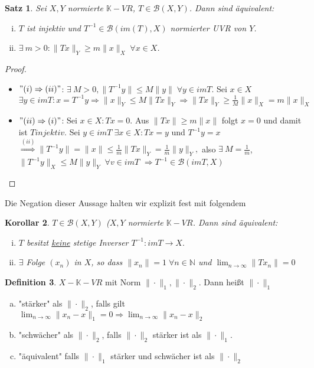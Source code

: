 \documentclass[ngerman]{report}
\theoremstyle{plain}%
\newtheorem{thm}{Satz}[chapter]
\newtheorem{cor}[thm]{Korollar}
\theoremstyle{definition}%
\newtheorem{definition}[thm]{Definition}
\theoremstyle{myStyle}
\newcommand{\N}{\mathbb{N}}
\newcommand{\K}{\mathbb{K}}
\newcommand{\B}{\mathcal{B}} %
\newcommand{\BS}[1][X,Y]{\mathcal{B}(#1)} %
\newcommand{\norm}[1]{\|#1\|}
\newcommand{\df}[1][]{%
	\overset{#1}{\Rightarrow}
}
\newcommand{\limes}[1][\infty]{\lim_{n \to #1}}
\newcommand{\inv}[1]{#1^{-1}}
\newcommand{\disp}{\displaystyle}
\newcommand{\qmarks}[1]{"#1"}
\begin{document}
	\begin{thm}
		Sei $X,Y$ normierte $\K-VR$, $T\in \BS$. Dann sind äquivalent:
			\begin{enumerate}[(i)]
				\item $T$ ist injektiv und $\inv{T} \in\B(im(T), X)$ normierter UVR von $Y$.
				\item $\exists \: m > 0: \norm{Tx}_Y \geq m\norm{x}_X \; \forall x\in X$.
			\end{enumerate}
	\end{thm}
	\begin{proof}
		\begin{itemize}[]
			\item $"(i)\df (ii)"$: $\exists \: M>0, \norm{\inv{T}y} \leq M\norm{y} \; \forall y\in imT.$
				Sei $x\in X$ $\exists y\in imT: x = \inv{T}y \df \norm{x}_Y \leq M \norm{Tx}_Y 
				\df \norm{Tx}_Y \geq \frac{1}{M} \norm{x}_X = m\norm{x}_X$
			\item $"(ii) \df (i)"$: Sei $x\in X: Tx = 0$.
				Aus $\norm{Tx} \geq m \norm{x}$ folgt $x = 0$ und damit ist $T injektiv$.
				Sei $y\in imT \; \exists x\in X: Tx = y$ und $\inv{T}y = x $
				$\df[(ii)] \norm{\inv{T}y} = \norm{x} \leq \frac{1}{m} \norm{Tx}_Y = \frac{1}{m} \norm{y}_Y,$
				also $\exists\: M = \frac{1}{m}$, $\norm{\inv{T}y}_X \leq M\norm{y}_Y \; \forall v\in imT$
				$\df \inv{T} \in \B(imT,X)$
		\end{itemize}
	\end{proof}
Die Negation dieser Aussage halten wir explizit fest mit folgendem 
	\begin{cor}
		$T \in \BS$ ($X,Y$ normierte $\K-VR$. Dann sind äquivalent:
			\begin{enumerate}[(i)]
				\item $T$ besitzt \underline{keine} stetige Inverser 
					$\inv{T} : imT\to X.$
				\item $\exists$ Folge $(x_n)$ in $X$, so dass $\norm{x_n} = 1 \; \forall n\in \N$
					und $\disp \limes \norm{T x_n} = 0$
			\end{enumerate}
	\end{cor}

	\begin{definition}
		$X-\K-VR$ mit Norm $\norm{\cdot}_1,\norm{\cdot}_2$. Dann heißt $\norm{\cdot}_1$ 
			\begin{enumerate}[(a)]
				\item \qmarks{stärker} als $\norm{\cdot}_2$, falls gilt
					$\disp \limes \norm{x_n - x}_1 = 0 \df \limes \norm{x_n - x}_2$
				\item \qmarks{schwächer} als $\norm{\cdot}_2$, falls $\norm{\cdot}_2$ stärker ist als $\norm{\cdot}_1$.
				\item \qmarks{äquivalent} falls $\norm{\cdot}_1$ stärker und schwächer ist als $\norm{\cdot}_2$
			\end{enumerate}
	\end{definition}
\end{document}
